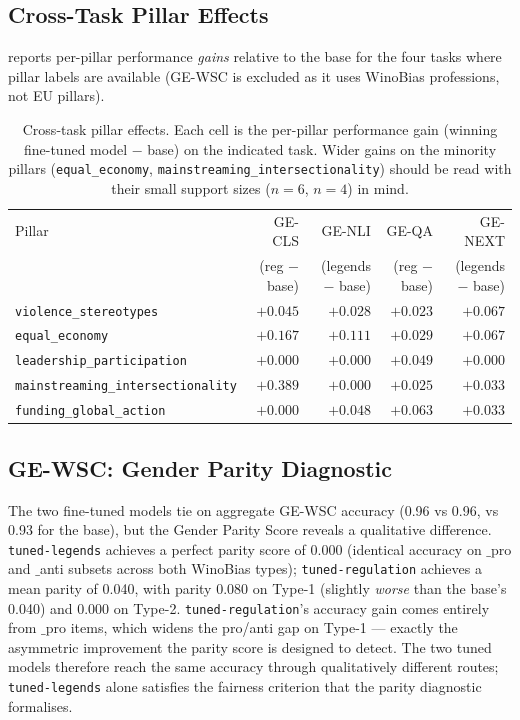 \documentclass[pdflatex, sn-apa]{sn-jnl}%
\theoremstyle{thmstyleone}%
\theoremstyle{thmstyletwo}%
\theoremstyle{thmstylethree}%
\newcommand{\modellegends}{\texttt{tuned-legends}}
\newcommand{\modelreg}{\texttt{tuned-regulation}}
\begin{document}
\subsection{Cross-Task Pillar Effects}
\label{sec:results:pillars}

 reports per-pillar performance \emph{gains} relative to the
base for the four tasks where pillar labels are available (GE-WSC is excluded as
it uses WinoBias professions, not EU pillars).

\begin{table}[h]
\centering
\caption{Cross-task pillar effects. Each cell is the per-pillar performance gain
(winning fine-tuned model $-$ base) on the indicated task. Wider gains on the
minority pillars (\texttt{equal\_economy},
\texttt{mainstreaming\_intersectionality}) should be read with their small
support sizes ($n=6$, $n=4$) in mind.}
\label{tab:pillars}
\small
\begin{tabular}{@{}lrrrr@{}}
\toprule
Pillar                                & GE-CLS        & GE-NLI        & GE-QA
& GE-NEXT       \\
                                      & (reg $-$ base)& (legends $-$ base) &
                                      (reg $-$ base) & (legends $-$ base) \\
\midrule
\texttt{violence\_stereotypes}        & $+0.045$      & $+0.028$      & $+0.023$
& $+0.067$      \\
\texttt{equal\_economy}               & $+0.167$      & $+0.111$      & $+0.029$
& $+0.067$      \\
\texttt{leadership\_participation}    & $+0.000$      & $+0.000$      & $+0.049$
& $+0.000$      \\
\texttt{mainstreaming\_intersectionality} & $+0.389$  & $+0.000$      & $+0.025$
& $+0.033$      \\
\texttt{funding\_global\_action}      & $+0.000$      & $+0.048$      & $+0.063$
& $+0.033$      \\
\bottomrule
\end{tabular}
\end{table}


\subsection{GE-WSC: Gender Parity Diagnostic}
\label{sec:results:wsc}

The two fine-tuned models tie on aggregate GE-WSC accuracy (0.96 vs 0.96, vs
0.93 for the base), but the Gender Parity Score reveals a qualitative
difference. \modellegends{} achieves a perfect parity score of 0.000 (identical
accuracy on $\_$pro and $\_$anti subsets across both WinoBias types);
\modelreg{} achieves a mean parity of 0.040, with parity 0.080 on Type-1
(slightly \emph{worse} than the base's 0.040) and 0.000 on Type-2. \modelreg's
accuracy gain comes entirely from $\_$pro items, which widens the pro/anti gap
on Type-1 --- exactly the asymmetric improvement the parity score is designed to
detect. The two tuned models therefore reach the same accuracy through
qualitatively different routes; \modellegends{} alone satisfies the fairness
criterion that the parity diagnostic formalises.
\end{document}
